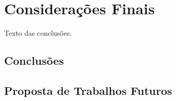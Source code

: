 \chapter{Considerações Finais}
\label{cap:05}

Texto das conclusões.

\section{Conclusões}

\section{Proposta de Trabalhos Futuros}